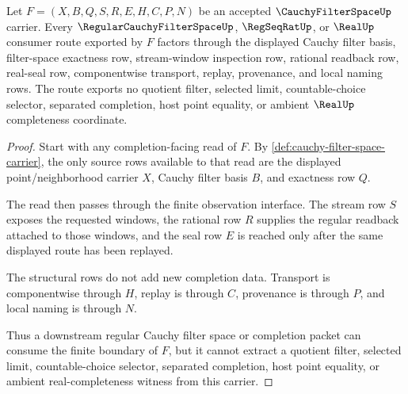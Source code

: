\begin{theorem}
\label{thm:cauchy-filter-space-completion-handoff}
Let $F=(X,B,Q,S,R,E,H,C,P,N)$ be an accepted $\CauchyFilterSpaceUp$ carrier. Every $\RegularCauchyFilterSpaceUp$, $\RegSeqRatUp$, or $\RealUp$ consumer route exported by $F$ factors through the displayed Cauchy filter basis, filter-space exactness row, stream-window inspection row, rational readback row, real-seal row, componentwise transport, replay, provenance, and local naming rows. The route exports no quotient filter, selected limit, countable-choice selector, separated completion, host point equality, or ambient $\RealUp$ completeness coordinate.
\end{theorem}
\begin{proof}
Start with any completion-facing read of $F$. By \autoref{def:cauchy-filter-space-carrier}, the only source rows available to that read are the displayed point/neighborhood carrier $X$, Cauchy filter basis $B$, and exactness row $Q$.

The read then passes through the finite observation interface. The stream row $S$ exposes the requested windows, the rational row $R$ supplies the regular readback attached to those windows, and the seal row $E$ is reached only after the same displayed route has been replayed.

The structural rows do not add new completion data. Transport is componentwise through $H$, replay is through $C$, provenance is through $P$, and local naming is through $N$.

Thus a downstream regular Cauchy filter space or completion packet can consume the finite boundary of $F$, but it cannot extract a quotient filter, selected limit, countable-choice selector, separated completion, host point equality, or ambient real-completeness witness from this carrier.
\end{proof}




